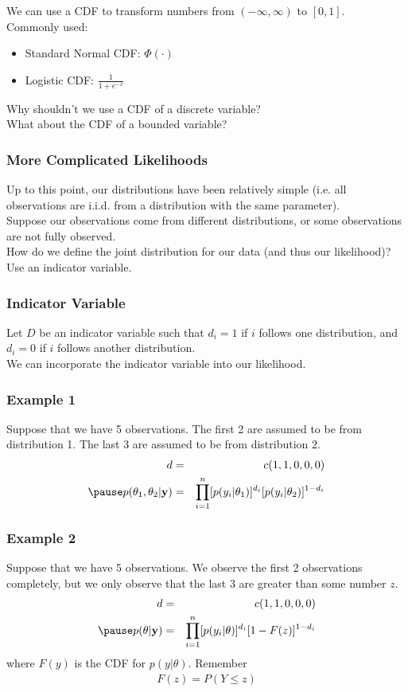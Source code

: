 \documentclass{beamer}
\begin{document}
\begin{frame}
We can use a CDF to transform numbers from $(-\infty, \infty)$ to $[0,1]$.\\
\bigskip
\pause
Commonly used: 
\pause
\begin{itemize}
\item Standard Normal CDF: $\Phi(\cdot)$\\
\pause
\item Logistic CDF: $\frac{1}{1 + e^{-x}}$
\end{itemize}
\pause
\bigskip
\bigskip
Why shouldn't we use a CDF of a discrete variable?\\
\pause
\bigskip
What about the CDF of a bounded variable?
\end{frame}

\begin{frame}
\frametitle{More Complicated Likelihoods}
\pause
Up to this point, our distributions have been relatively simple
(i.e. all observations are i.i.d. from a distribution with the same parameter).\\
\pause
\bigskip
Suppose our observations come from different distributions, or some
observations are not fully observed.  \\
\pause
\bigskip
How do we define the joint distribution for our data (and thus our likelihood)?\\
\pause
\bigskip
Use an indicator variable.
\end{frame}

\begin{frame}
\frametitle{Indicator Variable}
Let $D$ be an indicator variable such that $d_i = 1$ if $i$ follows
one distribution, and $d_i = 0$ if $i$ follows another distribution.\\
\pause
\bigskip
We can incorporate the indicator variable into our likelihood.
\end{frame}

\begin{frame}
\frametitle{Example 1}
\pause
Suppose that we have 5 observations.  The first 2 are assumed to be
from distribution 1.  The last 3 are assumed to be from distribution 2.
\pause
\bigskip
\begin{eqnarray*}
d &=& c(1,1,0,0,0)\\
\pause
p(\theta_1, \theta_2 | \mathbf{y}) &=& \prod_{i=1}^n [p(y_i |
\theta_1)]^{d_i} [p(y_i | \theta_2)]^{1-d_i}
\end{eqnarray*}
\end{frame}

\begin{frame}
\frametitle{Example 2}
\pause
Suppose that we have 5 observations.  We observe the first 2
observations completely, but we only observe that the last 3 are greater
than some number $z$. 
\pause
\bigskip
\begin{eqnarray*}
d &=& c(1,1,0,0,0)\\
\pause
p(\theta | \mathbf{y}) &=& \prod_{i=1}^n [p(y_i |
\theta)]^{d_i} [1 - F(z)]^{1-d_i}
\end{eqnarray*}
where $F(y)$ is the CDF for $p(y | \theta)$. \pause Remember
\begin{eqnarray*}
F(z) = P(Y \le z)
\end{eqnarray*}
\end{frame}
\end{document}
